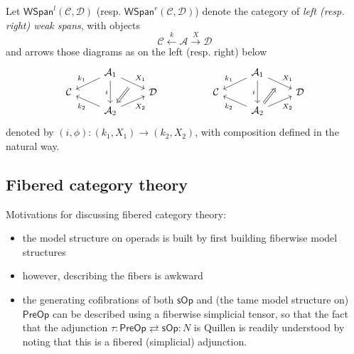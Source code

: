 \documentclass[a4paper,10pt
,draft
]{article}%
\renewcommand{\1}{\eta}%
\begin{document}
\begin{definition}
      Let $\mathsf{WSpan}^l(\mathcal C, \mathcal D)$ (resp. $\mathsf{WSpan}^r(\mathcal C, \mathcal D)$)
      denote the category of \textit{left (resp. right) weak spans}, with objects
      \begin{equation}
            \mathcal C \xleftarrow{k} \mathcal A \xrightarrow{X} \mathcal D
      \end{equation}
      and arrows those diagrams as on the left (resp. right) below
      \begin{equation}
            \begin{tikzcd}[row sep = tiny]
                  & \mathcal A_1 \arrow[dr, "X_1", ""'{name=U}] \arrow[dl, "k_1"'] \arrow[dd, "i"']
                  &
                  &&
                  &
                  \mathcal A_1 \arrow[dr, "X_1", ""'{name=A}] \arrow[dl, "k_1"'] \arrow[dd, "i"']
                  \\
                  \mathcal C
                  &&
                  \mathcal D
                  &&
                  \mathcal C
                  &&
                  \mathcal D
                  \\
                  & |[alias=V]| \mathcal A_2 \arrow[ur, "X_2"'] \arrow[ul, "k_2"]
                  &
                  &&
                  &
                  |[alias=B]| \mathcal A_2 \arrow[ur, "X_2"'] \arrow[ul, "k_2"]
                  \arrow[Rightarrow, from = U, to = V]
                  \arrow[Rightarrow, from = B, to = A]
            \end{tikzcd}
      \end{equation}
      denoted by $(i,\phi): (k_1,X_1) \to (k_2,X_2)$, with composition defined in the natural way.      
\end{definition}




\subsection{Fibered category theory}
\label{FIBCAT_SEC}

Motivations for discussing fibered category theory:
\begin{itemize}
\item the model structure on operads is built by first building fiberwise model structures
\item however, describing the fibers is awkward
\item the generating cofibrations of both $\mathsf{sOp}$
and (the tame model structure on) $\mathsf{PreOp}$
can be described using a fiberwise simplicial tensor,
so that the fact that the adjunction
$\tau \colon \mathsf{PreOp} \rightleftarrows \mathsf{sOp}\colon N$ is Quillen is readily understood by noting that this is a fibered (simplicial) adjunction.
\end{itemize}
\end{document}

